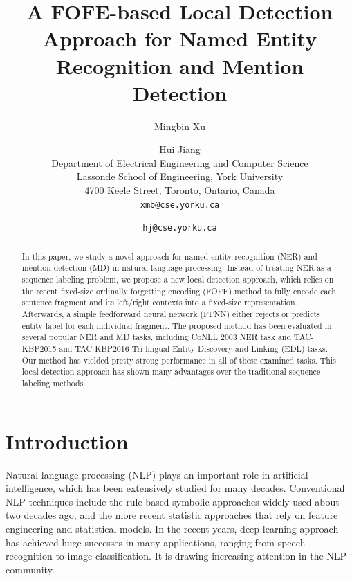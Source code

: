 \documentclass[11pt,a4paper]{article}
\title{A FOFE-based Local Detection Approach for Named Entity Recognition and Mention Detection}
\author{Mingbin Xu \and Hui Jiang \\
	Department of Electrical Engineering and Computer Science \\
	Lassonde School of Engineering, York University \\
	4700 Keele Street, Toronto, Ontario, Canada\\
	{\tt xmb@cse.yorku.ca} \and  {\tt hj@cse.yorku.ca}  
}
\date{}
\begin{document}
\maketitle


\begin{abstract}
	In this paper, we study a novel approach for named entity recognition (NER) and mention detection (MD) in natural language processing. Instead of treating NER as a sequence labeling problem, we propose a new local detection approach, which relies on the recent fixed-size ordinally forgetting encoding (FOFE) method to fully encode each sentence fragment and its left/right contexts into a fixed-size representation. Afterwards, a simple feedforward neural network (FFNN) either rejects or predicts entity label for each individual fragment. The proposed method has been evaluated in several popular NER and MD tasks, including CoNLL 2003 NER task and  TAC-KBP2015 and TAC-KBP2016 Tri-lingual Entity Discovery and Linking (EDL) tasks. Our method has yielded pretty strong performance in all of these examined tasks. This local detection approach has shown many advantages over the traditional sequence labeling  methods.
\end{abstract}


\section{Introduction}

Natural language processing (NLP) plays an important role in artificial intelligence, which has been extensively studied for many decades. Conventional NLP techniques include the rule-based symbolic approaches widely used about two decades ago, and the more recent statistic approaches that rely on feature engineering and statistical models. In the recent years, deep learning approach has achieved huge successes in many applications, ranging from speech recognition to image classification. It is drawing increasing attention in the NLP community. 
\end{document}
